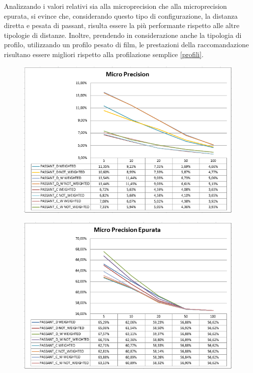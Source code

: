 Analizzando i valori relativi sia alla microprecision che alla microprecision epurata, si evince che, considerando questo tipo di configurazione, la distanza diretta e pesata di passant, risulta essere la più performante rispetto alle altre tipologie di distanze. Inoltre, prendendo in considerazione anche la tipologia di profilo, utilizzando un profilo pesato di film, le prestazioni della raccomandazione risultano essere migliori rispetto alla profilazione semplice \ref{profili}.
\begin{figure}[H]
	\includegraphics[width=\textwidth]{./images/graphs/micro_prec_Own}
\end{figure}

\begin{figure}[H]
	\includegraphics[width=\textwidth]{./images/graphs/micro_precT_Own}
\end{figure}

